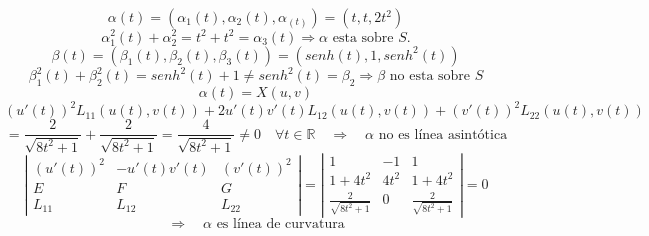 \documentclass{article}
\newcommand{\R}{\mathbb{R}}
\begin{document}
$$
\alpha(t) = (\alpha_1(t), \alpha_2(t), \alpha_(t)) = (t,t,2t^2)
$$
$$
\alpha_1^2(t)+\alpha_2^2 = t^2+t^2=\alpha_3(t) \Rightarrow \text{$\alpha$ esta sobre $S$.}
$$
$$
\beta(t)= (\beta_1(t), \beta_2(t), \beta_3(t))= (senh(t),1,senh^2(t))
$$
$$
\beta_1^2(t)+\beta_2^2(t)= senh^2(t)+1\ne senh^2(t)=\beta_2 \Rightarrow \text{$\beta$ no esta sobre $S$}
$$
$$
\alpha(t)=X(u,v)
$$
$$
(u'(t))^2L_{11}(u(t),v(t))+2u'(t)v'(t)L_{12}(u(t),v(t))+(v'(t))^2L_{22}(u(t),v(t))
$$
$$
= \frac{2}{\sqrt{8t^2+1}} + \frac{2}{\sqrt{8t^2+1}} = \frac{4}{\sqrt{8t^2+1}} \ne 0 \quad \forall t \in \R \quad \Rightarrow \quad \text{$\alpha$ no es línea asintótica}
$$
$$
\left|\begin{array}{ccc}
    (u'(t))^2 & -u'(t)v'(t) & (v'(t))^2 \\
    E & F & G \\
    L_{11} & L_{12} & L_{22}    
\end{array}\right| =
\left|\begin{array}{ccc}
    1 & -1 & 1 \\
    1+4t^2 & 4t^2 & 1+4t^2 \\
    \frac{2}{\sqrt{8t^2+1}} & 0 & \frac{2}{\sqrt{8t^2+1}} 
\end{array}\right| = 0
$$
$$
\Rightarrow \quad \text{$\alpha$ es línea de curvatura}
$$
\end{document}
